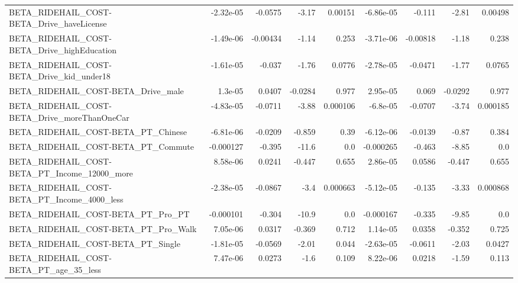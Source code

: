\begin{tabular}{lrrrrrrrr}
BETA\_RIDEHAIL\_COST-BETA\_Drive\_haveLicense          &   -2.32e-05 &      -0.0575 &     -3.17 &  0.00151 &  -6.86e-05 &      -0.111 &        -2.81 &       0.00498 \\
BETA\_RIDEHAIL\_COST-BETA\_Drive\_highEducation        &   -1.49e-06 &     -0.00434 &     -1.14 &    0.253 &  -3.71e-06 &    -0.00818 &        -1.18 &         0.238 \\
BETA\_RIDEHAIL\_COST-BETA\_Drive\_kid\_under18          &   -1.61e-05 &       -0.037 &     -1.76 &   0.0776 &  -2.78e-05 &     -0.0471 &        -1.77 &        0.0765 \\
BETA\_RIDEHAIL\_COST-BETA\_Drive\_male                 &     1.3e-05 &       0.0407 &   -0.0284 &    0.977 &   2.95e-05 &       0.069 &      -0.0292 &         0.977 \\
BETA\_RIDEHAIL\_COST-BETA\_Drive\_moreThanOneCar       &   -4.83e-05 &      -0.0711 &     -3.88 & 0.000106 &   -6.8e-05 &     -0.0707 &        -3.74 &      0.000185 \\
BETA\_RIDEHAIL\_COST-BETA\_PT\_Chinese                 &   -6.81e-06 &      -0.0209 &    -0.859 &     0.39 &  -6.12e-06 &     -0.0139 &        -0.87 &         0.384 \\
BETA\_RIDEHAIL\_COST-BETA\_PT\_Commute                 &   -0.000127 &       -0.395 &     -11.6 &      0.0 &  -0.000265 &      -0.463 &        -8.85 &           0.0 \\
BETA\_RIDEHAIL\_COST-BETA\_PT\_Income\_12000\_more       &    8.58e-06 &       0.0241 &    -0.447 &    0.655 &   2.86e-05 &      0.0586 &       -0.447 &         0.655 \\
BETA\_RIDEHAIL\_COST-BETA\_PT\_Income\_4000\_less        &   -2.38e-05 &      -0.0867 &      -3.4 & 0.000663 &  -5.12e-05 &      -0.135 &        -3.33 &      0.000868 \\
BETA\_RIDEHAIL\_COST-BETA\_PT\_Pro\_PT                  &   -0.000101 &       -0.304 &     -10.9 &      0.0 &  -0.000167 &      -0.335 &        -9.85 &           0.0 \\
BETA\_RIDEHAIL\_COST-BETA\_PT\_Pro\_Walk                &    7.05e-06 &       0.0317 &    -0.369 &    0.712 &   1.14e-05 &      0.0358 &       -0.352 &         0.725 \\
BETA\_RIDEHAIL\_COST-BETA\_PT\_Single                  &   -1.81e-05 &      -0.0569 &     -2.01 &    0.044 &  -2.63e-05 &     -0.0611 &        -2.03 &        0.0427 \\
BETA\_RIDEHAIL\_COST-BETA\_PT\_age\_35\_less             &    7.47e-06 &       0.0273 &      -1.6 &    0.109 &   8.22e-06 &      0.0218 &        -1.59 &         0.113 \\

\end{tabular}
